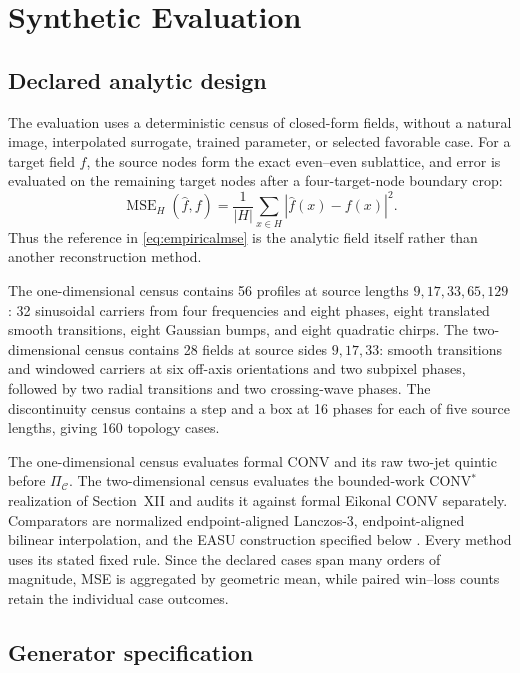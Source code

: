 \clearpage
\raggedbottom
\section{Synthetic Evaluation}

\subsection{Declared analytic design}

The evaluation uses a deterministic census of closed-form fields, without a
natural image, interpolated surrogate, trained parameter, or selected
favorable case. For a target field $f$, the source nodes form the exact
even--even sublattice, and error is evaluated on the remaining target nodes
after a four-target-node boundary crop:
\begin{equation}
 \operatorname{MSE}_{H}(\widehat f,f)
 =\frac{1}{|H|}\sum_{x\in H}|\widehat f(x)-f(x)|^2.
 \label{eq:empiricalmse}
\end{equation}
Thus the reference in \eqref{eq:empiricalmse} is the analytic field itself
rather than another reconstruction method.

The one-dimensional census contains 56 profiles at source lengths
$9,17,33,65,129$: 32 sinusoidal carriers from four frequencies and eight
phases, eight translated smooth transitions, eight Gaussian bumps, and eight
quadratic chirps. The two-dimensional census contains 28 fields at source
sides $9,17,33$: smooth transitions and windowed carriers at six off-axis
orientations and two subpixel phases, followed by two radial transitions and
two crossing-wave phases. The discontinuity census contains a step and a box
at 16 phases for each of five source lengths, giving 160 topology cases.

The one-dimensional census evaluates formal CONV and its raw two-jet
quintic before \(\Pi_{\mathcal C}\). The two-dimensional census evaluates
the bounded-work CONV$^{*}$ realization of Section~XII and audits it against
formal Eikonal CONV separately. Comparators are normalized endpoint-aligned
Lanczos-3, endpoint-aligned bilinear interpolation, and the EASU construction
specified below \cite{lanczos1956,lottes2021}. Every method uses its stated
fixed rule. Since the declared cases span many orders of magnitude, MSE is
aggregated by geometric mean, while paired win--loss counts retain the
individual case outcomes.

\subsection{Generator specification}

